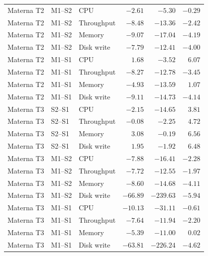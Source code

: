 \documentclass[a4paper,11pt]{article}
\begin{document}
\begin{longtable}{@{}lllrrr@{}}
  Materna T2 & M1--S2 & CPU & $-2.61$ & $-5.30$ & $-0.29$ \\
  Materna T2 & M1--S2 & Throughput & $-8.48$ & $-13.36$ & $-2.42$ \\
  Materna T2 & M1--S2 & Memory & $-9.07$ & $-17.04$ & $-4.19$ \\
  Materna T2 & M1--S2 & Disk write & $-7.79$ & $-12.41$ & $-4.00$ \\
  Materna T2 & M1--S1 & CPU & $ 1.68$ & $-3.52$ & $ 6.07$ \\
  Materna T2 & M1--S1 & Throughput & $-8.27$ & $-12.78$ & $-3.45$ \\
  Materna T2 & M1--S1 & Memory & $-4.93$ & $-13.59$ & $ 1.07$ \\
  Materna T2 & M1--S1 & Disk write & $-9.11$ & $-14.73$ & $-4.14$ \\
  Materna T3 & S2--S1 & CPU & $-2.15$ & $-14.65$ & $ 3.81$ \\
  Materna T3 & S2--S1 & Throughput & $-0.08$ & $-2.25$ & $ 4.72$ \\
  Materna T3 & S2--S1 & Memory & $ 3.08$ & $-0.19$ & $ 6.56$ \\
  Materna T3 & S2--S1 & Disk write & $ 1.95$ & $-1.92$ & $ 6.48$ \\
  Materna T3 & M1--S2 & CPU & $-7.88$ & $-16.41$ & $-2.28$ \\
  Materna T3 & M1--S2 & Throughput & $-7.72$ & $-12.55$ & $-1.97$ \\
  Materna T3 & M1--S2 & Memory & $-8.60$ & $-14.68$ & $-4.11$ \\
  Materna T3 & M1--S2 & Disk write & $-66.89$ & $-239.63$ & $-5.94$ \\
  Materna T3 & M1--S1 & CPU & $-10.13$ & $-31.11$ & $-0.61$ \\
  Materna T3 & M1--S1 & Throughput & $-7.64$ & $-11.94$ & $-2.20$ \\
  Materna T3 & M1--S1 & Memory & $-5.39$ & $-11.00$ & $ 0.02$ \\
  Materna T3 & M1--S1 & Disk write & $-63.81$ & $-226.24$ & $-4.62$ \\
\end{longtable}
\normalsize
\end{document}
